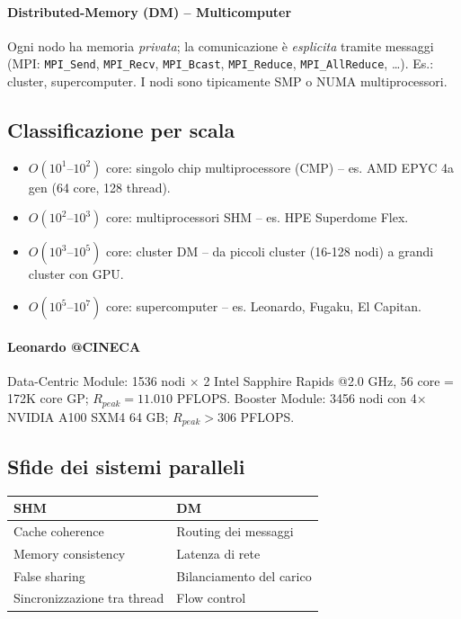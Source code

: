 \documentclass[11pt,a4paper]{article}
\theoremstyle{remark}
\begin{document}
\paragraph{Distributed-Memory (DM) -- Multicomputer}
Ogni nodo ha memoria \emph{privata}; la comunicazione è \emph{esplicita} tramite messaggi (MPI: \texttt{MPI\_Send}, \texttt{MPI\_Recv}, \texttt{MPI\_Bcast}, \texttt{MPI\_Reduce}, \texttt{MPI\_AllReduce}, \dots).
Es.: cluster, supercomputer. I nodi sono tipicamente SMP o NUMA multiprocessori.

\subsection{Classificazione per scala}

\begin{itemize}
  \item $O(10^1\text{--}10^2)$ core: singolo chip multiprocessore (CMP) -- es. AMD EPYC 4a gen (64 core, 128 thread).
  \item $O(10^2\text{--}10^3)$ core: multiprocessori SHM -- es. HPE Superdome Flex.
  \item $O(10^3\text{--}10^5)$ core: cluster DM -- da piccoli cluster (16-128 nodi) a grandi cluster con GPU.
  \item $O(10^5\text{--}10^7)$ core: supercomputer -- es. Leonardo, Fugaku, El Capitan.
\end{itemize}

\paragraph{Leonardo @CINECA}
Data-Centric Module: 1536 nodi $\times$ 2 Intel Sapphire Rapids @2.0 GHz, 56 core = 172K core GP; $R_{peak} = 11.010$ PFLOPS.
Booster Module: 3456 nodi con 4$\times$ NVIDIA A100 SXM4 64 GB; $R_{peak} > 306$ PFLOPS.

\subsection{Sfide dei sistemi paralleli}

\begin{tabular}{ll}
\toprule
SHM & DM \\
\midrule
Cache coherence & Routing dei messaggi \\
Memory consistency & Latenza di rete \\
False sharing & Bilanciamento del carico \\
Sincronizzazione tra thread & Flow control \\
\bottomrule
\end{tabular}
\end{document}
